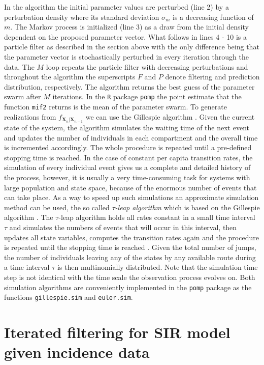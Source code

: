 In the algorithm the initial parameter values are perturbed (line 2) by a perturbation density where its  standard  deviation $\sigma_m$ is a decreasing function of $m$. The Markov process is initialized (line 3) as a draw from the initial density dependent on the proposed parameter vector. What follows in lines 4 - 10 is a particle filter as described in the section above with the only difference being that the parameter vector is stochastically perturbed in every iteration through the data. The 
$M$ loop repeats the  particle filter with decreasing perturbations and throughout the algorithm the 
superscripts $F$ and $P$ denote filtering and prediction distribution, respectively. The algorithm returns the best guess of the parameter swarm after $M$ iterations. In the \texttt{R} package \texttt{pomp} the point estimate that the function \texttt{mif2} returns is the mean of the parameter swarm.
\newline
To generate realizations from $f_{\bm{X}_n|\bm{X}_{n-1}}$  we can use the Gillespie algorithm \citep{gila}. Given the current state of the system, the algorithm simulates the waiting time of the next event and updates the number of individuals in each compartment and the overall  time is incremented  accordingly.  The whole procedure is repeated until a pre-defined stopping time is reached. In the case of constant per capita transition rates, the simulation of every individual event gives us a complete and detailed  history of the process, however, it is usually a very time-consuming task for systems with large population and  state space, because of the enormous number of events that can take place. 
  As a way to speed up such simulations an approximate simulation method can be used, the so called \textit{$\tau$-leap algorithm} which is based on the Gillespie algorithm \citep{gil}.  
The $\tau$-leap algorithm holds all rates constant in a small time interval $\tau$ and simulates the numbers of events that will occur in this interval, then updates all state variables, computes the transition rates again and the procedure is repeated until the stopping time is reached \citep{taul,into}. 
Given the total number of jumps, the number of individuals leaving any of the states by any available route during a  time interval $\tau$ is then  multinomially distributed. Note that the simulation time step is  not identical with the time scale the observation process evolves on.
Both simulation algorithms are conveniently implemented in the \texttt{pomp} package as the functions \texttt{gillespie.sim} and \texttt{euler.sim}.
\section{Iterated filtering for SIR model given incidence data}
\label{examplesir}
